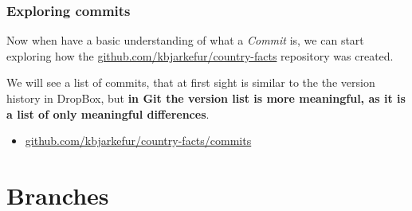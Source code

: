 \documentclass[aspectratio=169]{beamer} %
\newcommand{\trainingURL}[1]{{\color{blue}\url{#1}}}
\newcommand{\traininerUsername}{kbjarkefur}
\newcommand{\repoName}{\traininerUsername/country-facts}
\newcommand{\trainingRepoURL}[1]{\trainingURL{github.com/\repoName #1}}
\begin{document}
\begin{frame}
	\frametitle{Exploring commits}

	Now when have a basic understanding of what a \textit{Commit} is, we can start exploring how the \trainingRepoURL{} repository was created.
	
	\vspace{.25cm}
	
	We will see a list of commits, that at first sight is similar to the the version history in DropBox, but \textbf{in Git the version list is more meaningful, as it is a list of only meaningful differences}.

	\vspace{.25cm}
	
	\begin{itemize}
		\item \trainingRepoURL{/commits}
	\end{itemize}	

\end{frame}

\section{Branches}
\end{document}
